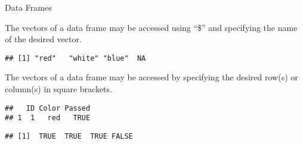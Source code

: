 \begin{frame}[fragile]{Data Frames}
\protect\hypertarget{data-frames-2}{}

The vectors of a data frame may be accessed using ``\$'' and specifying
the name of the desired vector.

\begin{Shaded}
\begin{Highlighting}[]
\OperatorTok{$}
\end{Highlighting}
\end{Shaded}

\begin{verbatim}
## [1] "red"   "white" "blue"  NA
\end{verbatim}

The vectors of a data frame may be accessed by specifying the desired
row(s) or column(s) in square brackets.

\begin{Shaded}
\begin{Highlighting}[]
\NormalTok{    mydataframe[}\NormalTok{,]}
\end{Highlighting}
\end{Shaded}

\begin{verbatim}
##   ID Color Passed
## 1  1   red   TRUE
\end{verbatim}

\begin{Shaded}
\begin{Highlighting}[]
\NormalTok{  mydataframe[,}\NormalTok{]}
\end{Highlighting}
\end{Shaded}

\begin{verbatim}
## [1]  TRUE  TRUE  TRUE FALSE
\end{verbatim}

\end{frame}

